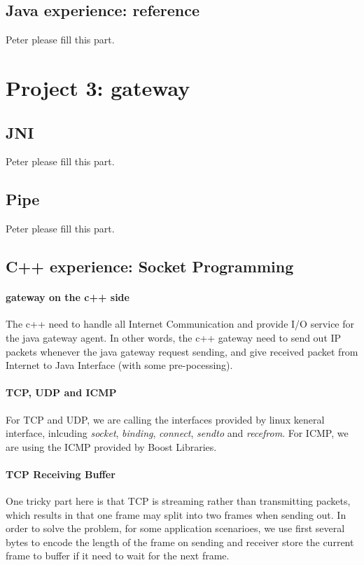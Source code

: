 \documentclass[conference,compsoc]{IEEEtran}
\begin{document}
	\subsection{Java experience: reference}
		Peter please fill this part.

\section{Project 3: gateway}

	
	\subsection{JNI}
		Peter please fill this part.
	
	\subsection{Pipe}
		Peter please fill this part.
		
	
	\subsection{C++ experience: Socket Programming}
		\paragraph{\textbf{gateway on the c++ side}}
		The c++ need to handle all Internet Communication and provide I/O service for the java gateway agent. In other words, the c++ gateway need to send out IP packets whenever the java gateway request sending, and give received packet from Internet to Java Interface (with some pre-pocessing).
		
		
		\paragraph{\textbf{TCP, UDP and ICMP}}
		For TCP and UDP, we are calling the interfaces provided by linux keneral interface, inlcuding \emph{socket}, \emph{binding}, \emph{connect}, \emph{sendto} and \emph{recefrom}. For ICMP, we are using the ICMP provided by Boost Libraries. 
		\paragraph{\textbf{TCP Receiving Buffer}}
		 One tricky part here is that TCP is streaming rather than transmitting packets, which results in that one frame may split into two frames when sending out. In order to solve the problem, for some application scenarioes, we use first several bytes to encode the length of the frame on sending and receiver store the current frame to buffer if it need to wait for the next frame.
		
\end{document}
